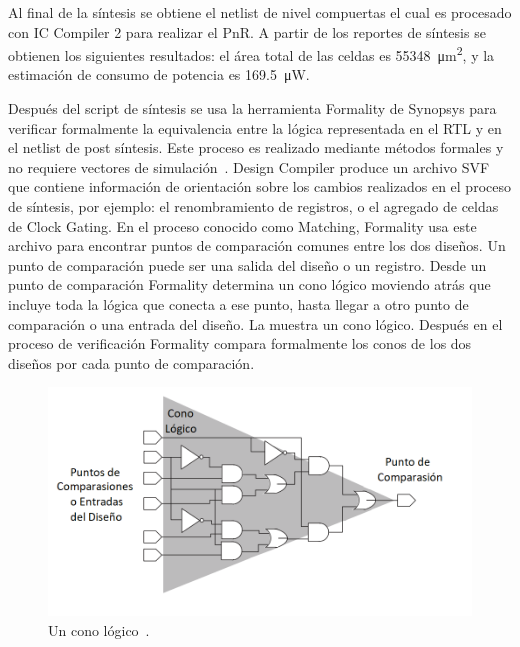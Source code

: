 \documentclass[a4paper, twoside, 11pt]{report}
\begin{document}
Al final de la síntesis se obtiene el netlist de nivel compuertas el cual es procesado con IC Compiler 2 para realizar el PnR. A partir de los reportes de síntesis se obtienen los siguientes resultados: el área total de las celdas es \SI{55348}{\micro\meter\squared}, y la estimación de consumo de potencia es \SI{169.5}{\micro\watt}.

Después del script de síntesis se usa la herramienta Formality de Synopsys para verificar formalmente la equivalencia entre la lógica representada en el RTL y en el netlist de post síntesis. Este proceso es realizado mediante métodos formales y no requiere vectores de simulación~\cite[traducción mía]{formality_ug}. Design Compiler produce un archivo SVF que contiene información de orientación sobre los cambios realizados en el proceso de síntesis, por ejemplo: el renombramiento de registros, o el agregado de celdas de Clock Gating. En el proceso conocido como Matching, Formality usa este archivo para encontrar puntos de comparación comunes entre los dos diseños. Un punto de comparación puede ser una salida del diseño o un registro. Desde un punto de comparación Formality determina un cono lógico moviendo atrás que incluye toda la lógica que conecta a ese punto, hasta llegar a otro punto de comparación o una entrada del diseño. La  muestra un cono lógico. Después en el proceso de verificación Formality compara formalmente los conos de los dos diseños por cada punto de comparación.

\begin{figure}[htb]
  \centering
  \includegraphics[width=1.0\textwidth]{./img/logic_cones}
  \caption{Un cono lógico~\cite[modificaciones mías]{formality_ug}.}
  \label{fig:logic_cones}
\end{figure}

\FloatBarrier
\end{document}

